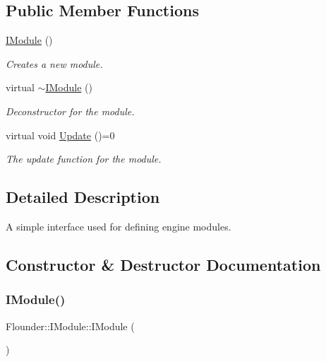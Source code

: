 \subsection*{Public Member Functions}
\begin{DoxyCompactItemize}
\item 
\hyperlink{class_flounder_1_1_i_module_abc5451af7d1582d531665c76793f9c5f}{I\+Module} ()
\begin{DoxyCompactList}\small\item\em Creates a new module. \end{DoxyCompactList}\item 
virtual \hyperlink{class_flounder_1_1_i_module_a7046424df461dfa1b87d372a5c00f3cd}{$\sim$\+I\+Module} ()
\begin{DoxyCompactList}\small\item\em Deconstructor for the module. \end{DoxyCompactList}\item 
virtual void \hyperlink{class_flounder_1_1_i_module_a1812bb03a6990e4698a10c043fa25fde}{Update} ()=0
\begin{DoxyCompactList}\small\item\em The update function for the module. \end{DoxyCompactList}\end{DoxyCompactItemize}


\subsection{Detailed Description}
A simple interface used for defining engine modules. 



\subsection{Constructor \& Destructor Documentation}
\mbox{\label{class_flounder_1_1_i_module_abc5451af7d1582d531665c76793f9c5f}} 
\subsubsection{\texorpdfstring{I\+Module()}{IModule()}}
{\footnotesize\ttfamily Flounder\+::\+I\+Module\+::\+I\+Module (\begin{DoxyParamCaption}{ }\end{DoxyParamCaption})\hspace{0.3cm}{\ttfamily [inline]}}



